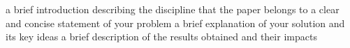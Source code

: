 a brief introduction describing the discipline that the paper belongs to
a clear and concise statement of your problem
a brief explanation of your solution and its key ideas
a brief description of the results obtained and their impacts